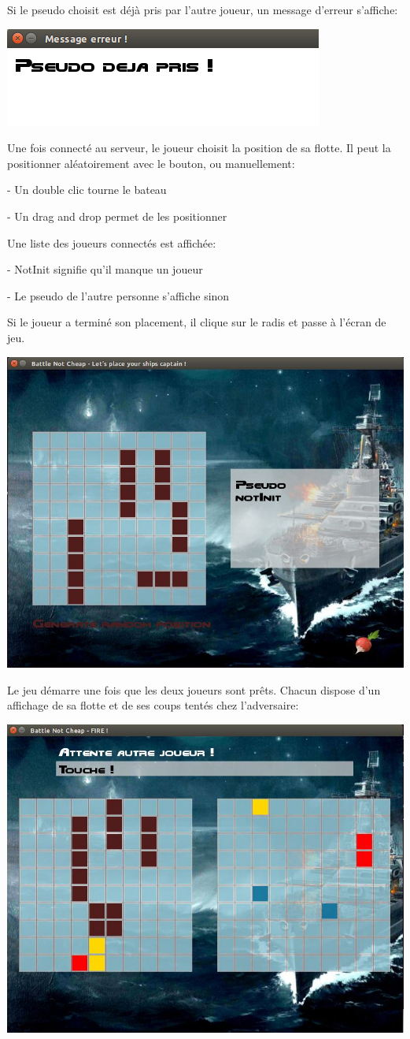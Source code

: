 \documentclass[a4paper,oneside]{article}
\begin{document}
Si le pseudo choisit est déjà pris par l'autre joueur, un message d'erreur s'affiche:
\\
\begin{center}
	
	\includegraphics[width = 0.8\linewidth, height = 0.2\textheight ]{pseudoerror.png}
	\end{center}


Une fois connecté au serveur, le joueur choisit la position de sa flotte. Il peut la positionner aléatoirement avec le bouton, ou manuellement:


	- Un double clic tourne le bateau


	- Un drag and drop permet de les positionner
	

Une liste des joueurs connectés est affichée:


	- NotInit signifie qu'il manque un joueur


	- Le pseudo de l'autre personne s'affiche sinon


Si le joueur a terminé son placement, il clique sur le radis et passe à l'écran de jeu.
\\
\begin{center}
 	\includegraphics[width = 0.6\linewidth, height = 0.3\textheight ]{Ecran_attente.jpg}
\end{center}
 
Le jeu démarre une fois que les deux joueurs sont prêts. Chacun dispose d'un affichage de sa flotte et de ses coups tentés chez l'adversaire:
\\ 
\begin{center}
	\includegraphics[width = 0.6\linewidth, height = 0.3\textheight ]{Ecran_de_jeu.jpg}
\end{center}
\end{document}
